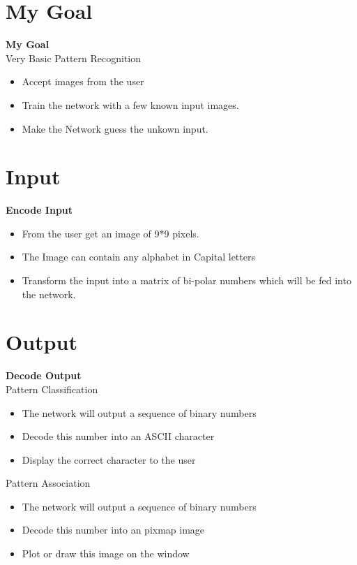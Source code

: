 \documentclass[xcolor=table]{beamer}
\begin{document}
\section{My Goal}
\begin{frame}
\textbf {My Goal} \\

Very Basic Pattern Recognition\\

\begin{itemize} [<+->]
\item Accept images from the user
\item Train the network with a few known input images.
\item Make the Network guess the unkown input.

\end{itemize}
\end{frame}

\section{Input}
\begin{frame}[fragile]
\textbf {Encode Input} \\
\begin{itemize} [<+->]
\item From the user get an image of 9*9 pixels.
\item The Image can contain any alphabet in Capital letters
\item Transform the input into a matrix of bi-polar numbers which will be fed into the network. 
\end{itemize}
\end{frame}

\section{Output}
\begin{frame}[fragile]
\textbf {Decode Output} \\
Pattern Classification
\begin{itemize} [<+->]
\item The network will output a sequence of binary numbers
\item Decode this number into an ASCII character
\item Display the correct character to the user
\end{itemize}
Pattern Association
\begin{itemize} [<+->]
\item The network will output a sequence of binary numbers
\item Decode this number into an pixmap image
\item Plot or draw this image on the window
\end{itemize}
\end{frame}
\end{document}
